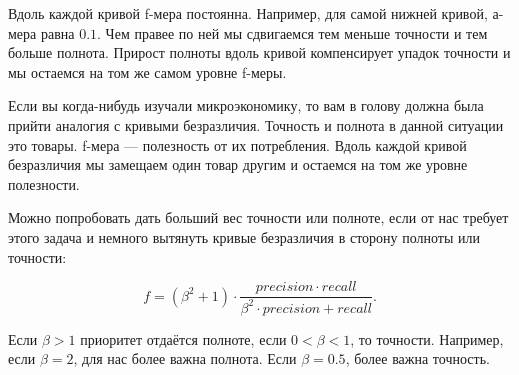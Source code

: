 \documentclass[12pt, a4paper, oneside]{article}
\theoremstyle{plain} %
\theoremstyle{definition}
\begin{document}
\begin{solution}
\begin{enumerate}
\begin{center}
\end{center}

Вдоль каждой кривой f-мера постоянна. Например, для самой нижней кривой, а-мера равна $0.1$. Чем правее по ней мы сдвигаемся тем меньше точности и тем больше полнота. Прирост полноты вдоль кривой компенсирует упадок точности и мы остаемся на том же самом уровне f-меры. 

Если вы когда-нибудь изучали микроэкономику, то вам в голову должна была прийти аналогия с кривыми безразличия. Точность и полнота в данной ситуации это товары. f-мера --- полезность от их потребления. Вдоль каждой кривой безразличия  мы замещаем один товар другим и остаемся на том же уровне полезности. 

Можно попробовать дать больший вес точности или полноте, если от нас требует этого задача и немного вытянуть кривые безразличия в сторону полноты или точности: 

	$$
	f = (\beta^2 + 1) \cdot \frac{precision \cdot recall}{\beta^2 \cdot precision + recall}.
	$$

Если $\beta > 1$ приоритет отдаётся полноте, если $0 < \beta < 1$, то точности. Например, если $\beta = 2$, для нас более важна полнота.  Если $\beta = 0.5$, более важна точность. 
\end{enumerate}
\end{solution}
\end{document}
